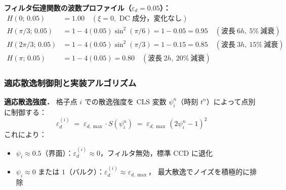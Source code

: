 \noindent\textbf{フィルタ伝達関数の波数プロファイル（$\varepsilon_d = 0.05$）：}
\begin{align*}
  H(0;\, 0.05)     &= 1.00 \quad (\xi = 0,\text{ DC 成分，変化なし}) \\
  H(\pi/3;\, 0.05) &= 1 - 4(0.05)\sin^2(\pi/6) = 1 - 0.05 = 0.95 \quad (\text{波長}\ 6h,\ 5\%\ \text{減衰}) \\
  H(2\pi/3;\, 0.05)&= 1 - 4(0.05)\sin^2(\pi/3) = 1 - 0.15 = 0.85 \quad (\text{波長}\ 3h,\ 15\%\ \text{減衰}) \\
  H(\pi;\, 0.05)   &= 1 - 4(0.05) = 0.80 \quad (\text{波長}\ 2h,\ 20\%\ \text{減衰})
\end{align*}

\subsubsection{適応散逸制御則と実装アルゴリズム}
\label{sec:dccd_adaptive}

\textbf{適応散逸強度．}
格子点 $i$ での散逸強度を CLS 変数 $\psi_i^n$（時刻 $t^n$）によって点別に制御する：
\begin{equation}
  \varepsilon_d^{(i)} \;=\; \varepsilon_{d,\max} \cdot S(\psi_i^n)
  \;=\; \varepsilon_{d,\max}\,(2\psi_i^n - 1)^2
  \label{eq:adaptive_eps}
\end{equation}
これにより：
\begin{itemize}
  \item $\psi_i \approx 0.5$（界面）：$\varepsilon_d^{(i)} \approx 0$，フィルタ無効，標準 CCD に退化
  \item $\psi_i \approx 0$ または $1$（バルク）：$\varepsilon_d^{(i)} \approx \varepsilon_{d,\max}$，
        最大散逸でノイズを積極的に排除
\end{itemize}

